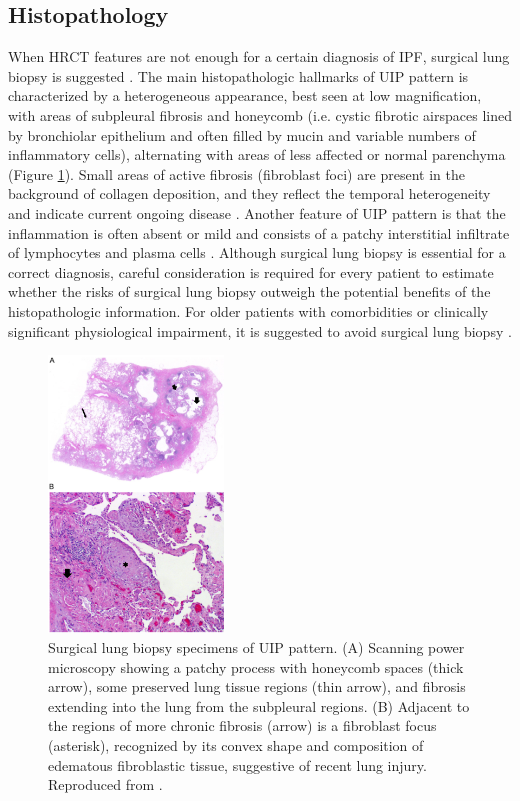 \subsection{Histopathology}
When HRCT features are not enough for a certain diagnosis of IPF, surgical lung biopsy is suggested \citep{richeldi2017idiopathic}. The main histopathologic hallmarks of UIP pattern is characterized by a heterogeneous appearance, best seen at low magnification, with areas of subpleural fibrosis and honeycomb (i.e. cystic fibrotic airspaces lined by bronchiolar epithelium and often filled by mucin and variable numbers of inflammatory cells), alternating with areas of less affected or normal parenchyma \citep{ american2000idiopathic, travis2002american} (Figure \ref{fig:SurgicalLungBiopsy}). Small areas of active fibrosis (fibroblast foci) are present in the background of collagen deposition, and they reflect the temporal heterogeneity and indicate current ongoing disease \citep{king2011idiopathic}. Another feature of UIP pattern is that the inflammation is often absent or mild and consists of a patchy interstitial infiltrate of lymphocytes and plasma cells \citep{raghu2011official,king2011idiopathic}. Although surgical lung biopsy is essential for a correct diagnosis, careful consideration is required for every patient to estimate whether the risks of surgical lung biopsy outweigh the potential benefits of the histopathologic information. For older patients with comorbidities or clinically significant physiological impairment, it is suggested to avoid surgical lung biopsy \citep{richeldi2017idiopathic}.

\begin{figure}[htbp]
  \centering 
  \includegraphics[height=2.9in]{Background/Image/SurgicalLungBiopsy.png}
  \caption{ Surgical lung biopsy specimens of UIP pattern. (A) Scanning power microscopy showing a patchy process with honeycomb
spaces (thick arrow), some preserved lung tissue regions (thin arrow), and fibrosis extending into the lung from the subpleural regions. (B) Adjacent to the regions of more chronic fibrosis (arrow) is a fibroblast focus (asterisk), recognized by its convex shape and composition of edematous fibroblastic tissue, suggestive of recent lung injury. Reproduced from \citep{raghu2011official}.}
  \label{fig:SurgicalLungBiopsy}
\end{figure}

